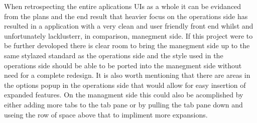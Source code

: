When retrospecting the entire aplications UIs as a whole it can be evidanced from the plans and the end result that heavier focus on the operations side has resulted in a application with a very clean and user friendly front end whilst and unfortunately lacklusterr, in comparison, manegment side. If this project were to be further devoloped there is clear room to bring the manegment side up to the same stylazed standard as the operations side and the style used in the operations side should be able to be ported into the manegment side without need for a complete redesign. It is also worth mentioning that there are areas in the options popup in the operations side that would allow for easy insertion of expanded features. On the managment side this could also be acomplished by either adding more tabs to the tab pane or by pulling the tab pane down and useing the row of space above that to impliment more expansions.